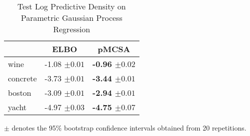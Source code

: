 
\begin{wraptable}{r}{0.4\textwidth}
  \centering
  \caption{Test Log Predictive Density on Parametric Gaussian Process Regression}\label{table:gp}
  \setlength{\tabcolsep}{4pt}
  \begin{threeparttable}
  \begin{tabular}{lrr}
    \toprule
    & \multicolumn{1}{c}{ELBO} & \multicolumn{1}{c}{\multirow{1}{*}{\textbf{pMCSA}}} \\
    \midrule
    wine & {-1.08 {\scriptsize{\(\pm 0.01\)}}} & {\bf-0.96 {\scriptsize{\(\pm 0.02\)}}} \\
    concrete & {-3.73 {\scriptsize{\(\pm 0.01\)}}} & {\bf-3.44 {\scriptsize{\(\pm 0.01\)}}} \\
    boston & {-3.09 {\scriptsize{\(\pm 0.01\)}}} & {\bf-2.94 {\scriptsize{\(\pm 0.01\)}}} \\
    yacht & {-4.97 {\scriptsize{\(\pm 0.03\)}}} & {\bf-4.75 {\scriptsize{\(\pm 0.07\)}}} \\\bottomrule
  \end{tabular}
  \begin{tablenotes}
    \item[]{\footnotesize \(\pm\) denotes the 95\% bootstrap confidence intervals obtained from 20 repetitions.}
  \end{tablenotes}
  \end{threeparttable}
  \vspace{-0.15in}
\end{wraptable}

